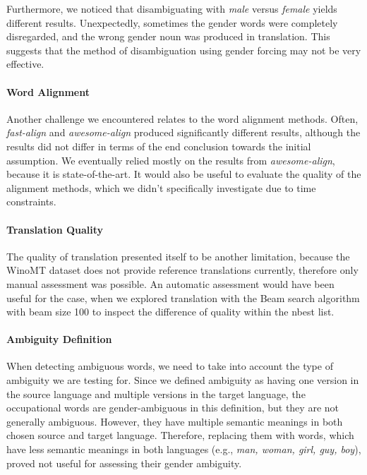 Furthermore, we noticed that disambiguating with \textit{male} versus \textit{female} yields different results. Unexpectedly, sometimes the gender words were completely disregarded, and the wrong gender noun was produced in translation. This suggests that the method of disambiguation using gender forcing may not be very effective.

\paragraph{Word Alignment}
Another challenge we encountered relates to the word alignment methods. Often, \textit{fast-align} and \textit{awesome-align} produced significantly different results, although the results did not differ in terms of the end conclusion towards the initial assumption. We eventually relied mostly on the results from \textit{awesome-align}, because it is state-of-the-art. It would also be useful to evaluate the quality of the alignment methods, which we didn't specifically investigate due to time constraints.

\paragraph{Translation Quality}
The quality of translation presented itself to be another limitation, because the WinoMT dataset does not provide reference translations currently, therefore only manual assessment was possible. An automatic assessment would have been useful for the case, when we explored translation with the Beam search algorithm with beam size 100 to inspect the difference of quality within the nbest list.

\newpage

\paragraph{Ambiguity Definition}
When detecting ambiguous words, we need to take into account the type of ambiguity we are testing for. Since we defined ambiguity as having one version in the source language and multiple versions in the target language, the occupational words are gender-ambiguous in this definition, but they are not generally ambiguous. However, they have multiple semantic meanings in both chosen source and target language. Therefore, replacing them with words, which have less semantic meanings in both languages (e.g., \textit{man, woman, girl, guy, boy}), proved not useful for assessing their gender ambiguity.


